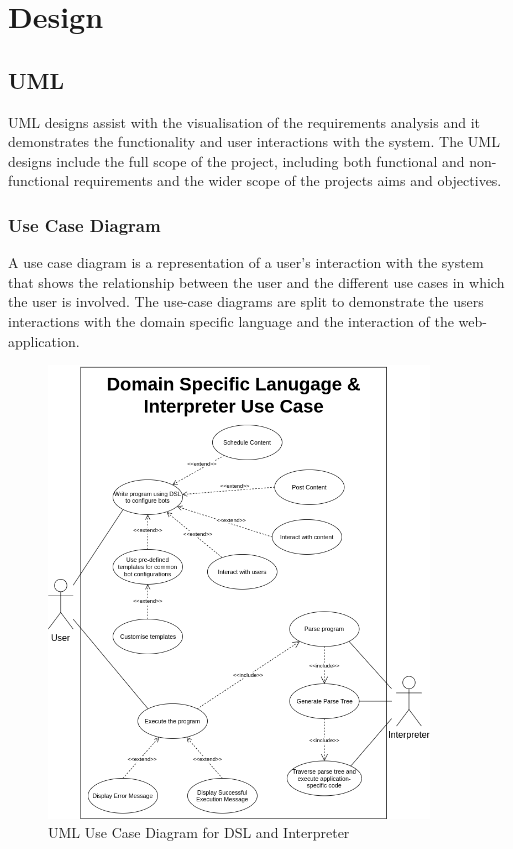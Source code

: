 \setlength{\grammarparsep}{2pt plus 1pt minus 1pt} %
\setlength{\grammarindent}{12em} %
\chapter{Design}
\section{UML}
UML designs assist with the visualisation of the requirements analysis and it demonstrates the functionality and user interactions with the system. The UML designs include the full scope of the project, including both functional and non-functional requirements and the wider scope of the projects aims and objectives.

\subsection{Use Case Diagram}

A use case diagram is a representation of a user's interaction with the system that shows the relationship between the user and the different use cases in which the user is involved. The use-case diagrams are split to demonstrate the users interactions with the domain specific language and the interaction of the web-application.
\begin{figure}
  \centering
  \includegraphics[width=0.9\textwidth]{images/usecasedsl.png}
  \caption{UML Use Case Diagram for DSL and Interpreter}
\end{figure}

